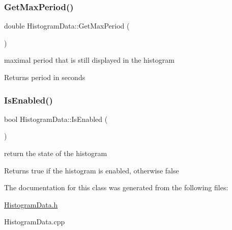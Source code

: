 \subsubsection{\texorpdfstring{Get\+Max\+Period()}{GetMaxPeriod()}}
{\footnotesize\ttfamily double Histogram\+Data\+::\+Get\+Max\+Period (\begin{DoxyParamCaption}{ }\end{DoxyParamCaption})}



maximal period that is still displayed in the histogram 

\begin{DoxyReturn}{Returns}
period in seconds 
\end{DoxyReturn}
\mbox{\label{classHistogramData_ae0639913744c2edaa4d688b22a753b6e}} 
\subsubsection{\texorpdfstring{Is\+Enabled()}{IsEnabled()}}
{\footnotesize\ttfamily bool Histogram\+Data\+::\+Is\+Enabled (\begin{DoxyParamCaption}{ }\end{DoxyParamCaption})}



return the state of the histogram 

\begin{DoxyReturn}{Returns}
true if the histogram is enabled, otherwise false 
\end{DoxyReturn}


The documentation for this class was generated from the following files\+:\begin{DoxyCompactItemize}
\item 
\hyperlink{HistogramData_8h}{Histogram\+Data.\+h}\item 
Histogram\+Data.\+cpp\end{DoxyCompactItemize}
